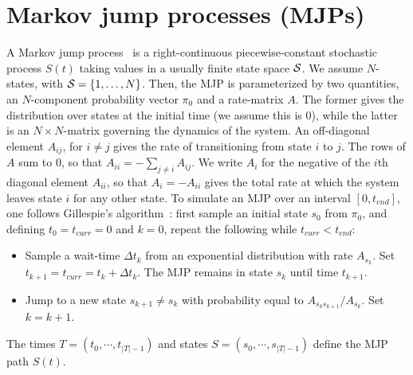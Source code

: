 \section{Markov jump processes (MJPs)} 
A Markov jump process~\cite{Cinlar1975} is a right-continuous 
piecewise-constant stochastic process $S(t)$ taking values in a 
usually finite state space ${\mathcal S}$. %
We assume $N$-states, with ${\mathcal S} = \{1,\ldots,N\}$. Then, 
the MJP is parameterized by two quantities, an $N$-component probability vector 
$\pi_0$ and a rate-matrix $A$. The former gives the distribution over states at 
the initial time (we assume this is $0$), while 
the latter is an $N \times N$-matrix governing the dynamics of the system.  An 
off-diagonal element $A_{ij}$, for $i \neq j$ gives the rate 
of transitioning from state $i$ to $j$. 
The rows of $A$ sum to $0$, so that $A_{ii}=-\sum_{j \neq i} A_{ij}  $. 
We write $A_i$ for the negative of the $i$th diagonal element $A_{ii}$, 
so that $A_i = -A_{ii}$ gives the total rate at which the system leaves state $i$ for any other state.
To simulate an MJP over an interval $[0,t_{end}]$, one follows 
Gillespie's algorithm~\cite{gillespie97}: 
first sample an initial state $s_0$ from $\pi_0$, and
defining $t_0 = t_{curr} = 0$ and $k = 0$, repeat the following while
$t_{curr} < t_{end}$:
\begin{itemize}
  \item Sample a wait-time $\Delta t_k$ from an exponential distribution with rate 
    $A_{s_k}$.  Set $t_{k+1} = t_{curr} = t_{k} + \Delta t_k$.
    The MJP remains in state $s_k$ until time $t_{k+1}$.
  \item Jump to a new state $s_{k+1} \neq s_k$ with 
    probability equal to $A_{s_ks_{k+1}}/A_{s_k}$. Set $k=k+1$.
\end{itemize}
The times $T=(t_0, \cdots, t_{|T| - 1})$ and states 
$S=(s_0, \cdots, s_{|T| - 1 })$ define the MJP path $S(t)$.

